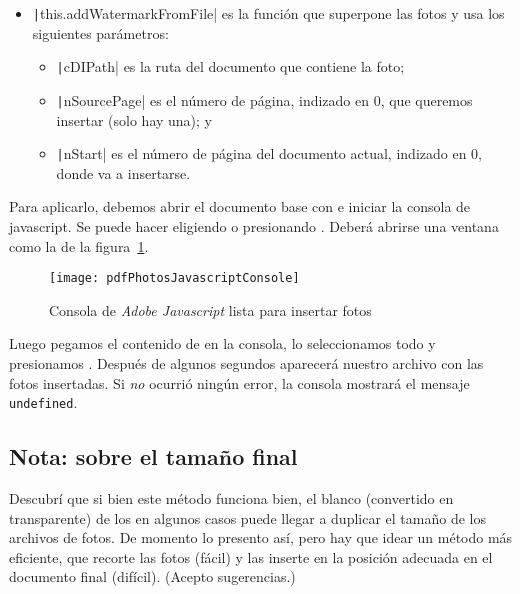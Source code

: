 \documentclass[%
	a5paper,
	10pt,
	twoside,
	openright,
	final,
]{memoir}
\begin{document}
{	\begin{itemize}[noitemsep]
		\item \texttt|this.addWatermarkFromFile| es la función que superpone las fotos y usa los siguientes parámetros:
		\begin{itemize}[noitemsep]
			\item \texttt|cDIPath| es la ruta del documento que contiene la foto;
			\item \texttt|nSourcePage| es el número de página, indizado en 0, que queremos insertar (solo hay una); y
			\item \texttt|nStart| es el número de página del documento actual, indizado en 0, donde va a insertarse.
		\end{itemize}
	\end{itemize}


	Para aplicarlo, debemos abrir el documento base  con \acrobat e iniciar la consola de javascript. Se puede hacer eligiendo  o presionando . Deberá abrirse una ventana como la de la figura~\ref{fig:pdfPhotosJavascriptConsole}.

	\begin{figure}
		\texttt{[image: pdfPhotosJavascriptConsole]}
		\caption{Consola de \emph{Adobe Javascript} lista para insertar fotos\label{fig:pdfPhotosJavascriptConsole}}
	\end{figure}

	Luego pegamos el contenido de  en la consola, lo seleccionamos todo y presionamos \keys{\ctrl + \return}. Después de algunos segundos aparecerá nuestro archivo  con las fotos insertadas. Si \emph{no} ocurrió ningún error, la consola mostrará el mensaje \texttt{undefined}.

	\subsection{Nota: sobre el tamaño final} Descubrí que si bien este método funciona bien, el blanco (convertido en transparente) de los \jpeg en algunos casos puede llegar a duplicar el tamaño de los archivos de fotos. De momento lo presento así, pero hay que idear un método más eficiente, que recorte las fotos (fácil) y las inserte en la posición adecuada en el documento final (difícil). (Acepto sugerencias.)

}
\end{document}
